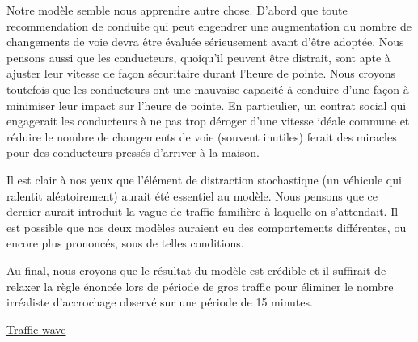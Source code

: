 \documentclass[12pt,letterpaper]{article}
\begin{document}
Notre modèle semble nous apprendre autre chose. D'abord que toute recommendation de conduite qui
peut engendrer une augmentation du nombre de changements de voie devra être évaluée sérieusement
avant d'être adoptée. Nous pensons aussi que les conducteurs, quoiqu'il peuvent être distrait, sont
apte à ajuster leur vitesse de façon sécuritaire durant l'heure de pointe. Nous croyons toutefois
que les conducteurs ont une mauvaise capacité à conduire d'une façon à minimiser leur impact sur
l'heure de pointe. En particulier, un contrat social qui engagerait les conducteurs à ne pas trop
déroger d'une vitesse idéale commune et réduire le nombre de changements de voie (souvent
inutiles) ferait des miracles pour des conducteurs pressés d'arriver à la maison.

Il est clair à nos yeux que l'élément de distraction stochastique (un véhicule qui ralentit
aléatoirement) aurait été essentiel au modèle. Nous pensons que ce dernier aurait introduit la vague
de traffic\cite{wave} familière à laquelle on s'attendait. Il est possible que nos deux modèles
auraient eu des comportements différentes, ou encore plus prononcés, sous de telles conditions.

Au final, nous croyons que le résultat du modèle est crédible et il suffirait de relaxer la règle
énoncée lors de période de gros traffic pour éliminer le nombre irréaliste d'accrochage observé sur
une période de 15 minutes.

\begin{thebibliography}{9}
     \href{https://en.wikipedia.org/wiki/Traffic_wave}{Traffic wave}
\end{thebibliography}
\end{document}
